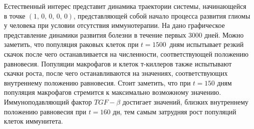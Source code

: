 \documentclass[14pt,a4paper]{extarticle}
\begin{document}
\begin{example}
		Естественный интерес представит динамика траектории системы, начинающейся в точке $\left(1,\,0,\,0,\,0,\,0\right)$, представляющей собой начало процесса развития глиомы у человека при условии отсутствия иммунотерапии. На  дано графическое представление динамики развития болезни в течение первых 3000 дней. Можно заметить, что популяция раковых клеток при $t=1500$~дням испытывает резкий скачок после чего останавливается на численности, соответствующей положению равновесия. Популяции макрофагов и клеток т-киллеров также испытывают скачки роста, после чего останавливаются на значениях, соответствующих внутреннему положению равновесия. Стоит заметить, что при $t=150$ дням популяция макрофагов стремится к максимально возможному значению. Иммуноподавляющий фактор $TGF-\beta$ достигает значений, близких внутреннему положению равновесия при $t=160$ дн, тем самым затрудняя рост популяций клеток иммунитета.
		

\end{example}
\end{document}
